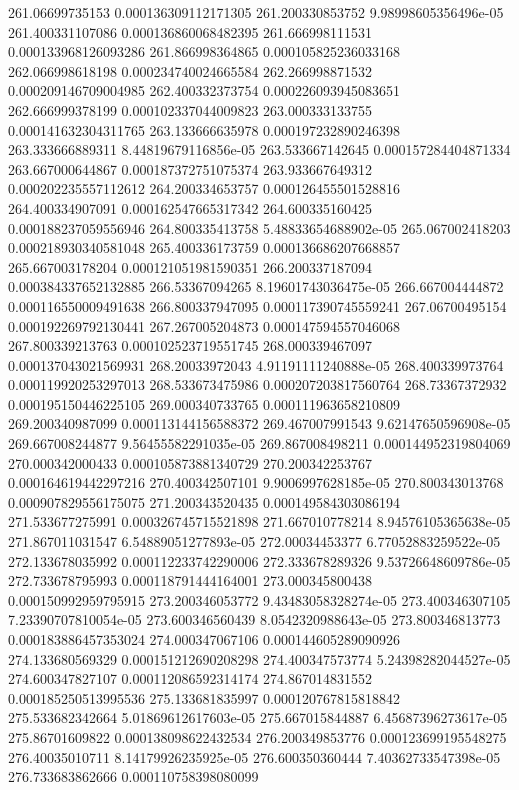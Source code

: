 {261.06699735153 0.000136309112171305
261.200330853752 9.98998605356496e-05
261.400331107086 0.000136860068482395
261.666998111531 0.000133968126093286
261.866998364865 0.000105825236033168
262.066998618198 0.000234740024665584
262.266998871532 0.000209146709004985
262.400332373754 0.000226093945083651
262.666999378199 0.000102337044009823
263.000333133755 0.000141632304311765
263.133666635978 0.000197232890246398
263.333666889311 8.44819679116856e-05
263.533667142645 0.000157284404871334
263.667000644867 0.000187372751075374
263.933667649312 0.000202235557112612
264.200334653757 0.000126455501528816
264.400334907091 0.000162547665317342
264.600335160425 0.000188237059556946
264.800335413758 5.48833654688902e-05
265.067002418203 0.000218930340581048
265.400336173759 0.000136686207668857
265.667003178204 0.000121051981590351
266.200337187094 0.000384337652132885
266.53367094265 8.19601743036475e-05
266.667004444872 0.000116550009491638
266.800337947095 0.000117390745559241
267.06700495154 0.000192269792130441
267.267005204873 0.000147594557046068
267.800339213763 0.000102523719551745
268.000339467097 0.000137043021569931
268.20033972043 4.91191111240888e-05
268.400339973764 0.000119920253297013
268.533673475986 0.000207203817560764
268.73367372932 0.000195150446225105
269.000340733765 0.000111963658210809
269.200340987099 0.000113144156588372
269.467007991543 9.62147650596908e-05
269.667008244877 9.56455582291035e-05
269.867008498211 0.000144952319804069
270.000342000433 0.000105873881340729
270.200342253767 0.000164619442297216
270.400342507101 9.9006997628185e-05
270.800343013768 0.000907829556175075
271.200343520435 0.000149584303086194
271.533677275991 0.000326745715521898
271.667010778214 8.94576105365638e-05
271.867011031547 6.54889051277893e-05
272.00034453377 6.77052883259522e-05
272.133678035992 0.000112233742290006
272.333678289326 9.53726648609786e-05
272.733678795993 0.000118791444164001
273.000345800438 0.000150992959795915
273.200346053772 9.43483058328274e-05
273.400346307105 7.23390707810054e-05
273.600346560439 8.0542320988643e-05
273.800346813773 0.000183886457353024
274.000347067106 0.000144605289090926
274.133680569329 0.000151212690208298
274.400347573774 5.24398282044527e-05
274.600347827107 0.000112086592314174
274.867014831552 0.000185250513995536
275.133681835997 0.000120767815818842
275.533682342664 5.01869612617603e-05
275.667015844887 6.45687396273617e-05
275.86701609822 0.000138098622432534
276.200349853776 0.000123699195548275
276.40035010711 8.14179926235925e-05
276.600350360444 7.40362733547398e-05
276.733683862666 0.000110758398080099
}
